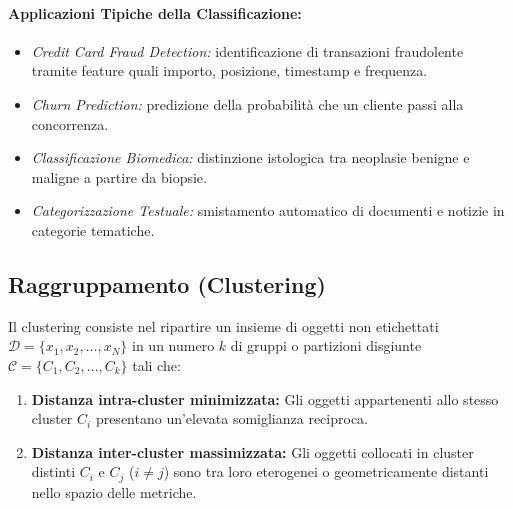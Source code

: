 \paragraph{Applicazioni Tipiche della Classificazione:}
\begin{itemize}
    \item \textit{Credit Card Fraud Detection:} identificazione di transazioni fraudolente tramite feature quali importo, posizione, timestamp e frequenza.
    \item \textit{Churn Prediction:} predizione della probabilit\`a che un cliente passi alla concorrenza.
    \item \textit{Classificazione Biomedica:} distinzione istologica tra neoplasie benigne e maligne a partire da biopsie.
    \item \textit{Categorizzazione Testuale:} smistamento automatico di documenti e notizie in categorie tematiche.
\end{itemize}

\subsection{Raggruppamento (Clustering)}
Il clustering consiste nel ripartire un insieme di oggetti non etichettati $\mathcal{D} = \{x_1, x_2, \dots, x_N\}$ in un numero $k$ di gruppi o partizioni disgiunte $\mathcal{C} = \{C_1, C_2, \dots, C_k\}$ tali che:
\begin{enumerate}
    \item \textbf{Distanza intra-cluster minimizzata:} Gli oggetti appartenenti allo stesso cluster $C_i$ presentano un'elevata somiglianza reciproca.
    \item \textbf{Distanza inter-cluster massimizzata:} Gli oggetti collocati in cluster distinti $C_i$ e $C_j$ ($i \neq j$) sono tra loro eterogenei o geometricamente distanti nello spazio delle metriche.
\end{enumerate}

